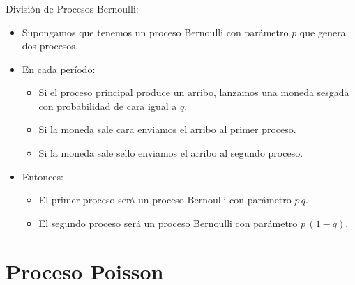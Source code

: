 \documentclass[ 10pt, xcolor = dvipsnames]{beamer}
\begin{document}
\begin{frame}[allowframebreaks]
\frametitle{\insertsection}

Divisi\'on de Procesos Bernoulli: 
\begin{itemize}
\item Supongamos que tenemos un proceso Bernoulli con par\'ametro $p$ que genera dos procesos. 
\item En cada per\'iodo: 
\begin{itemize}
\item Si el proceso principal produce un arribo, lanzamos una moneda sesgada con probabilidad de cara igual a $q$. 
\item Si la moneda sale cara enviamos el arribo al primer proceso. 
\item Si la moneda sale sello enviamos el arribo al segundo proceso. 
\end{itemize}
\item Entonces: 
\begin{itemize}
\item El primer proceso ser\'a un proceso Bernoulli con par\'ametro $p \, q$. 
\item El segundo proceso ser\'a un proceso Bernoulli con par\'ametro $p \, (1-q)$. 
\end{itemize}
\end{itemize}

\end{frame}

\section{Proceso Poisson}
\end{document}
